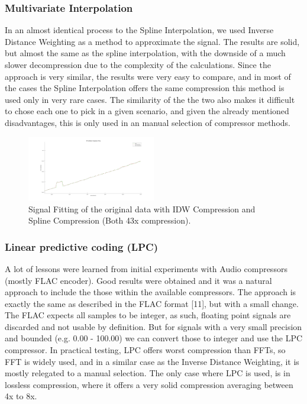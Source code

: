 \documentclass[conference]{IEEEtran}
\begin{document}
\vspace{10pt}
\subsubsection{Multivariate Interpolation}

In an almost identical process to the Spline Interpolation, we used Inverse Distance Weighting as a method to approximate the signal.
The results are solid, but almost the same as the spline interpolation, with the downside of a much slower decompression due to the complexity of the calculations.
Since the approach is very similar, the results were very easy to compare, and in most of the cases the Spline Interpolation offers the same compression this method is used
only in very rare cases.
The similarity of the the two also makes it difficult to chose each one to pick in a given scenario, and given the already mentioned disadvantages, this is only used in an manual selection of compressor methods.

\begin{figure}[ht]
  \centering
  \includegraphics[width=0.5\textwidth]{IDW_Spline_Comparison.png}
  \caption{Signal Fitting of the original data with IDW Compression and Spline Compression (Both 43x compression).}
  \label{Fig.4}
\end{figure}
\vspace{5pt}

\vspace{10pt}
\subsubsection{Linear predictive coding (LPC)}

A lot of lessons were learned from initial experiments with Audio compressors (mostly FLAC encoder).
Good results were obtained and it was a natural approach to include the those within the available compressors.
The approach is exactly the same as described in the FLAC format [11], but with a small change.
The FLAC expects all samples to be integer, as such, floating point signals are discarded and not usable by definition.
But for signals with a very small precision and bounded (e.g. 0.00 - 100.00) we can convert those to integer and use the LPC compressor.
In practical testing, LPC offers worst compression than FFTs, so FFT is widely used, and in a similar case as the Inverse Distance Weighting, it is mostly relegated to a manual selection.
The only case where LPC is used, is in lossless compression, where it offers a very solid compression averaging between 4x to 8x.
\end{document}
